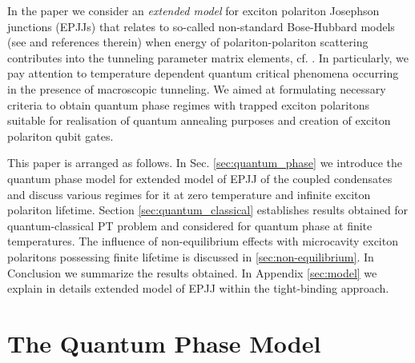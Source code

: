 \documentclass[aps, pre, preprint, groupedaddress, superscriptaddress, showkeys, showpacs] {revtex4-1}
\begin{document}
In the paper we consider an \textit{extended model} for exciton polariton Josephson junctions (EPJJs) that relates to so-called non-standard Bose-Hubbard models (see \cite{Dutta} and references therein) when energy of polariton-polariton scattering contributes into the tunneling parameter matrix elements, cf. \cite{Aleiner, Shelykh_2008, Borgh_2010, Solnyshkov_2008, Sarchi}.
In particularly, we pay attention to temperature dependent quantum critical phenomena occurring in the presence of macroscopic tunneling.
We aimed at formulating necessary criteria to obtain quantum phase regimes with trapped exciton polaritons suitable for realisation of quantum annealing purposes and creation of exciton polariton qubit gates.

This paper is arranged as follows.
In Sec. \ref{sec:quantum_phase} we introduce the quantum phase model for extended model of EPJJ of the coupled condensates and discuss various regimes for it at zero temperature and infinite exciton polariton lifetime. Section \ref{sec:quantum_classical} establishes  results obtained for quantum-classical PT problem and considered for quantum phase  at finite temperatures.  The influence of non-equilibrium effects with microcavity exciton polaritons possessing finite lifetime is discussed in \ref{sec:non-equilibrium}.      
In Conclusion we summarize the results obtained.
In Appendix \ref{sec:model} we explain in details  extended model of EPJJ within the tight-binding approach. 
\section{The Quantum Phase Model \label{sec:quantum_phase}}
\end{document}
